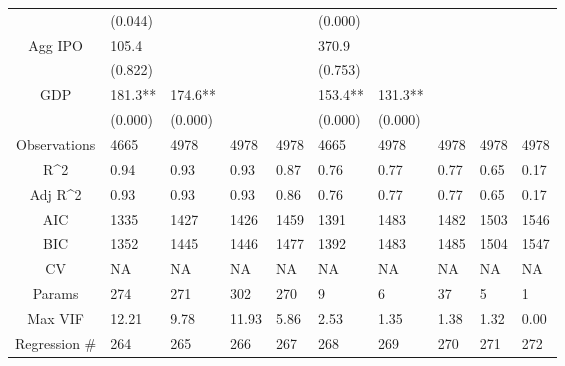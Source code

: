 \documentclass{article}
\begin{document}
\begin{table}[H]
\begin{tabular}{|clllllllll|}
   & (0.044) &  &  &  & (0.000) &  &  &  &  \\
  Agg IPO & 105.4 &  &  &  & 370.9 &  &  &  &  \\
   & (0.822) &  &  &  & (0.753) &  &  &  &  \\
  GDP & 181.3** & 174.6** &  &  & 153.4** & 131.3** &  &  &  \\
   & (0.000) & (0.000) &  &  & (0.000) & (0.000) &  &  &  \\
  \hline
 Observations & 4665 & 4978 & 4978 & 4978 & 4665 & 4978 & 4978 & 4978 & 4978 \\
  R^2 & 0.94 & 0.93 & 0.93 & 0.87 & 0.76 & 0.77 & 0.77 & 0.65 & 0.17 \\
  Adj R^2 & 0.93 & 0.93 & 0.93 & 0.86 & 0.76 & 0.77 & 0.77 & 0.65 & 0.17 \\
  AIC & 1335 & 1427 & 1426 & 1459 & 1391 & 1483 & 1482 & 1503 & 1546 \\
  BIC & 1352 & 1445 & 1446 & 1477 & 1392 & 1483 & 1485 & 1504 & 1547 \\
  CV & NA & NA & NA & NA & NA & NA & NA & NA & NA \\
  Params & 274 & 271 & 302 & 270 & 9 & 6 & 37 & 5 & 1 \\
  Max VIF & 12.21 & 9.78 & 11.93 & 5.86 & 2.53 & 1.35 & 1.38 & 1.32 & 0.00 \\
  Regression \# & 264 & 265 & 266 & 267 & 268 & 269 & 270 & 271 & 272 \\
   \hline
\end{tabular}

\end{table}
\end{document}
